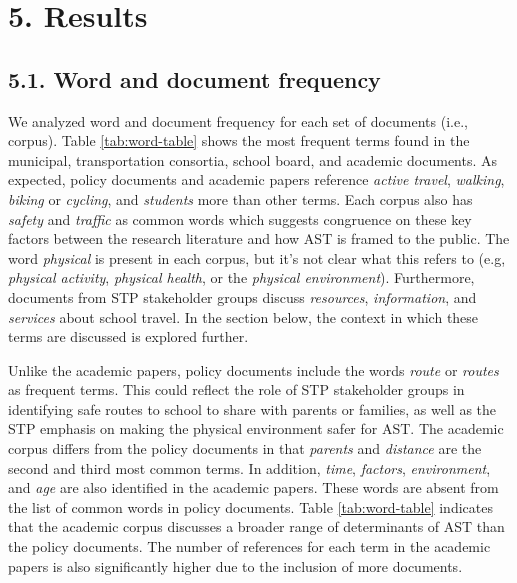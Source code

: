 \documentclass[]{elsarticle} %
\begin{document}
\hypertarget{results}{%
\section{5. Results}\label{results}}

\hypertarget{word-and-document-frequency}{%
\subsection{5.1. Word and document
frequency}\label{word-and-document-frequency}}

We analyzed word and document frequency for each set of documents (i.e.,
corpus). Table \ref{tab:word-table} shows the most frequent terms found
in the municipal, transportation consortia, school board, and academic
documents. As expected, policy documents and academic papers reference
\emph{active travel}, \emph{walking}, \emph{biking} or \emph{cycling},
and \emph{students} more than other terms. Each corpus also has
\emph{safety} and \emph{traffic} as common words which suggests
congruence on these key factors between the research literature and how
AST is framed to the public. The word \emph{physical} is present in each
corpus, but it's not clear what this refers to (e.g, \emph{physical
activity}, \emph{physical health}, or the \emph{physical environment}).
Furthermore, documents from STP stakeholder groups discuss
\emph{resources}, \emph{information}, and \emph{services} about school
travel. In the section below, the context in which these terms are
discussed is explored further.

Unlike the academic papers, policy documents include the words
\emph{route} or \emph{routes} as frequent terms. This could reflect the
role of STP stakeholder groups in identifying safe routes to school to
share with parents or families, as well as the STP emphasis on making
the physical environment safer for AST. The academic corpus differs from
the policy documents in that \emph{parents} and \emph{distance} are the
second and third most common terms. In addition, \emph{time},
\emph{factors}, \emph{environment}, and \emph{age} are also identified
in the academic papers. These words are absent from the list of common
words in policy documents. Table \ref{tab:word-table} indicates that the
academic corpus discusses a broader range of determinants of AST than
the policy documents. The number of references for each term in the
academic papers is also significantly higher due to the inclusion of
more documents.
\end{document}
